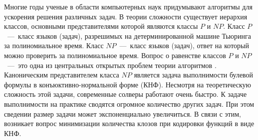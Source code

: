
Многие годы ученые в области компьютерных наук придумывают алгоритмы для ускорения решения различных задач. В теории сложности существует иерархия классов, основными представителями которой являются классы $P$ и $NP$. Класс $P$~---~класс языков (задач), разрешимых на детерминированной машине Тьюринга за полиномиальное время. Класс $NP$~---~класс языков (задач), ответ на который можно проверить за полиномиальное время. Вопрос о равенстве классов $P$ и $NP$~---~это одна из центральных открытых проблем теории алгоритмов \cite{cook2000p}. Каноническим представителем класса $NP$ является задача выполнимости булевой формулы в конъюктивно-нормальной форме (КНФ). Несмотря на теоретическую сложность этой задачи, современные солверы работают очень быстро. К задаче выполнимости на практике сводятся огромное количество других задач. При этом сведении размер задачи может экспоненциально увеличиться. В связи с этим, возникает вопрос минимизации количества клозов при кодировки функций в виде КНФ.